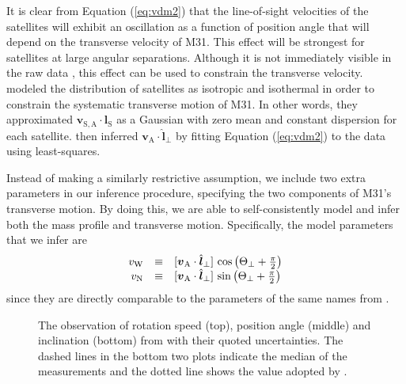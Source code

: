 \documentclass[preprint,12pt]{aastex}
\newcommand{\figlabel}[1]{\label{fig:#1}}
\newcommand{\eq}[1]{Equation (\ref{eq:#1})}
\newcommand{\bvec}[1]{\ensuremath{\boldsymbol{#1}}}
\renewcommand{\vector}[1]{\ensuremath{\bvec{#1}}}
\newcommand{\vel}[1]{\ensuremath{\vector{v}_\mathrm{#1}}}
\newcommand{\vrel}[2]{\ensuremath{\vector{v}_{\mathrm{#1},\mathrm{#2}}}}
\newcommand{\losperp}{\ensuremath{\hat{\vector{l}}_\perp}}
\newcommand{\lossat}{\ensuremath{\hat{\vector{l}}_\mathrm{S}}}
\newcommand{\posangperp}{\ensuremath{\Theta_\perp}}
\newcommand{\vw}{\ensuremath{v_\mathrm{W}}}
\newcommand{\vn}{\ensuremath{v_\mathrm{N}}}
\begin{document}
It is clear from \eq{vdm2} that the line-of-sight velocities of
the satellites will exhibit an oscillation as a function of position angle
that will depend on the transverse velocity of M31.  This effect will be
strongest for satellites at large angular separations.  Although it is not
immediately visible in the raw data \citep[see figure 1 of][]{vdm}, this
effect can be used to constrain the transverse velocity. \citet{vdm}
modeled the distribution of satellites as isotropic and isothermal in
order to constrain the systematic transverse motion of M31. In other words,
they approximated $\vrel{S}{A}\cdot\lossat$ as a Gaussian with zero mean
and constant dispersion for each satellite. \citet{vdm} then inferred
$\vel{A}\cdot\losperp$ by fitting \eq{vdm2} to the data using least-squares.

Instead of making a similarly restrictive assumption, we include two extra
parameters in our inference procedure, specifying the two components of M31's
transverse motion. By doing this, we are able to self-consistently model and
infer both the mass profile and transverse motion. Specifically, the
model parameters that we infer are
\begin{equation}
    \begin{array}{r c l}
    \vw & \equiv & [\vel{A}\cdot\losperp]
            \, \cos\left ( \posangperp + \frac{\pi}{2} \right ) \\
    \vn & \equiv & [\vel{A}\cdot\losperp]
            \, \sin \left ( \posangperp + \frac{\pi}{2} \right )
    \end{array}
\end{equation}
since they are directly comparable to the parameters of the same names
from \citet{vdm}.



\clearpage

\begin{figure}[tbp]
    \caption{The observation of rotation speed (top), position angle (middle)
        and inclination (bottom) from \citet{Chemin:2009} with their quoted
        uncertainties.  The dashed lines in the bottom two plots indicate
        the median of the measurements and the dotted line shows the value
        adopted by \citet{Chemin:2009}. \figlabel{rc_data}}
\end{figure}
\end{document}
